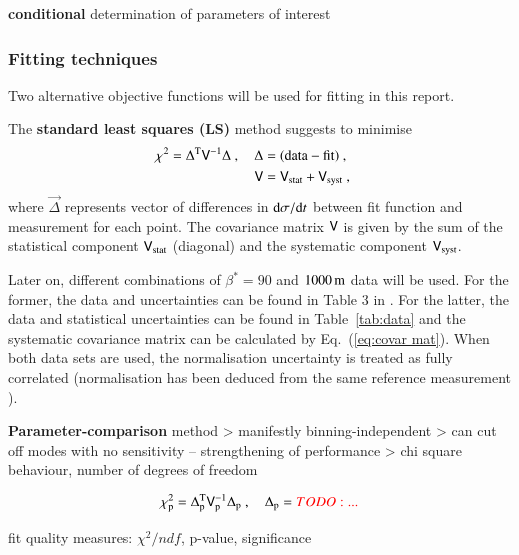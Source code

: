 \>  {\bf conditional} determination of parameters of interest


\subsubsection{Fitting techniques}

Two alternative objective functions will be used for fitting in this report.

The {\bf standard least squares (LS)} method suggests to minimise
\begin{equation}
\label{eq:chi sq LS}
	\begin{aligned}
		\chi^2 = \Delta^{\rm T} \mathsf{V}^{-1} \Delta\ ,\quad \Delta &= (\hbox{data} - \hbox{fit})\ ,\cr
																		\mathsf{V} &= \mathsf{V}_{\rm stat} + \mathsf{V}_{\rm syst}\ ,\cr
	\end{aligned}
\end{equation}
where $\vec\Delta$ represents vector of differences in ${\rm d}\sigma/{\rm d} t$ between fit function and measurement for each point. The covariance matrix $\mathsf{V}$ is given by the sum of the statistical component $\mathsf{V}_{\rm stat}$ (diagonal) and the systematic component $\mathsf{V}_{\rm syst}$.

Later on, different combinations of $\beta^* = 90$ and $1000\,{\rm m}$ data will be used. For the former, the data and uncertainties can be found in Table 3 in \cite{8tev-90m}. For the latter, the data and statistical uncertainties can be found in Table~\ref{tab:data} and the systematic covariance matrix can be calculated by Eq.~(\ref{eq:covar mat}). When both data sets are used, the normalisation uncertainty is treated as fully correlated (normalisation has been deduced from the same reference measurement \cite{prl111}).

\> {\bf Parameter-comparison} method
\>> manifestly binning-independent
\>> can cut off modes with no sensitivity -- strengthening of performance
\>> chi square behaviour, number of degrees of freedom

\begin{equation}
\label{eq:chi sq parcmp}
\chi_{\rm p}^2 = \Delta_{\rm p}^\T \mat V_{\rm p}^{-1} \Delta_{\rm p}\ ,\quad \Delta_{\rm p} = \TODO{...} 
\end{equation}

\> fit quality measures: $\chi^2/ndf$, p-value, significance

